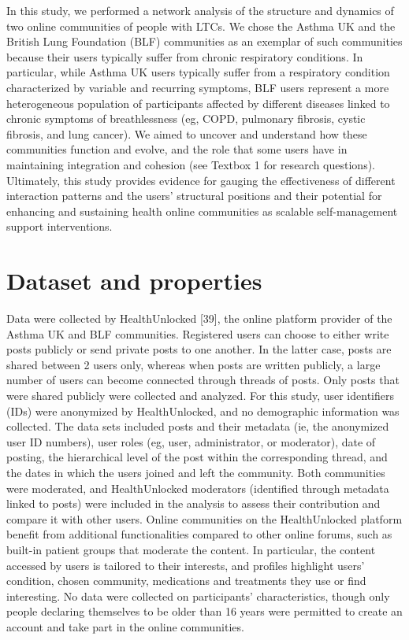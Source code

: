 In this study, we performed a network analysis of the structure and dynamics of two online communities of people with LTCs. We chose the Asthma UK and the British Lung Foundation (BLF) communities as an exemplar of such communities because their users typically suffer from chronic respiratory conditions. In particular, while Asthma UK users typically suffer from a respiratory condition characterized by variable and recurring symptoms, BLF users represent a more heterogeneous population of participants affected by different diseases linked to chronic symptoms of breathlessness (eg, COPD, pulmonary fibrosis, cystic fibrosis, and lung cancer).
We aimed to uncover and understand how these communities function and evolve, and the role that some users have in maintaining integration and cohesion (see Textbox 1 for research questions). Ultimately, this study provides evidence for gauging the effectiveness of different interaction patterns and the users’ structural positions and their potential for enhancing and sustaining health online communities as scalable self-management support interventions.\textbf{}




\section{Dataset and properties}
Data were collected by HealthUnlocked [39], the online platform provider of the Asthma UK and BLF communities. Registered users can choose to either write posts publicly or send private posts to one another. In the latter case, posts are shared between 2 users only, whereas when posts are written publicly, a large number of users can become connected through threads of posts. Only posts that were shared publicly were collected and analyzed. For this study, user identifiers (IDs) were anonymized by HealthUnlocked, and no demographic information was collected. The data sets included posts and their metadata (ie, the anonymized user ID numbers), user roles (eg, user, administrator, or moderator), date of posting, the hierarchical level of the post within the corresponding thread, and the dates in which the users joined and left the community. Both communities were moderated, and HealthUnlocked moderators (identified through metadata linked to posts) were included in the analysis to assess their contribution and compare it with other users. Online communities on the HealthUnlocked platform benefit from additional functionalities compared to other online forums, such as built-in patient groups that moderate the content. In particular, the content accessed by users is tailored to their interests, and profiles highlight users’ condition, chosen community, medications and treatments they use or find interesting. No data were collected on participants’ characteristics, though only people declaring themselves to be older than 16 years were permitted to create an account and take part in the online communities.


